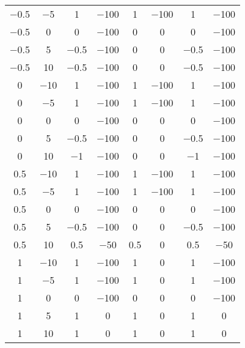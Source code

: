 {\begin{longtable}{c @{\extracolsep{\fill}} ccccccc}
            \num{-0.5} & \num{-5}  & \num{1}    & \num{-100} & \num{1}   & \num{-100} & \num{1}    & \num{-100}  \\
            \num{-0.5} & \num{0}   & \num{0}    & \num{-100} & \num{0}   & \num{0}    & \num{0}    & \num{-100}  \\
            \num{-0.5} & \num{5}   & \num{-0.5} & \num{-100} & \num{0}   & \num{0}    & \num{-0.5} & \num{-100}  \\
            \num{-0.5} & \num{10}  & \num{-0.5} & \num{-100} & \num{0}   & \num{0}    & \num{-0.5} & \num{-100}  \\
            \num{0}    & \num{-10} & \num{1}    & \num{-100} & \num{1}   & \num{-100} & \num{1}    & \num{-100}  \\
            \num{0}    & \num{-5}  & \num{1}    & \num{-100} & \num{1}   & \num{-100} & \num{1}    & \num{-100}  \\
            \num{0}    & \num{0}   & \num{0}    & \num{-100} & \num{0}   & \num{0}    & \num{0}    & \num{-100}  \\
            \num{0}    & \num{5}   & \num{-0.5} & \num{-100} & \num{0}   & \num{0}    & \num{-0.5} & \num{-100}  \\
            \num{0}    & \num{10}  & \num{-1}   & \num{-100} & \num{0}   & \num{0}    & \num{-1}   & \num{-100}  \\
            \num{0.5}  & \num{-10} & \num{1}    & \num{-100} & \num{1}   & \num{-100} & \num{1}    & \num{-100}  \\
            \num{0.5}  & \num{-5}  & \num{1}    & \num{-100} & \num{1}   & \num{-100} & \num{1}    & \num{-100}  \\
            \num{0.5}  & \num{0}   & \num{0}    & \num{-100} & \num{0}   & \num{0}    & \num{0}    & \num{-100}  \\
            \num{0.5}  & \num{5}   & \num{-0.5} & \num{-100} & \num{0}   & \num{0}    & \num{-0.5} & \num{-100}  \\
            \num{0.5}  & \num{10}  & \num{0.5}  & \num{-50}  & \num{0.5} & \num{0}    & \num{0.5}  & \num{-50}   \\
            \num{1}    & \num{-10} & \num{1}    & \num{-100} & \num{1}   & \num{0}    & \num{1}    & \num{-100}  \\
            \num{1}    & \num{-5}  & \num{1}    & \num{-100} & \num{1}   & \num{0}    & \num{1}    & \num{-100}  \\
            \num{1}    & \num{0}   & \num{0}    & \num{-100} & \num{0}   & \num{0}    & \num{0}    & \num{-100}  \\
            \num{1}    & \num{5}   & \num{1}    & \num{0}    & \num{1}   & \num{0}    & \num{1}    & \num{0}     \\
            \num{1}    & \num{10}  & \num{1}    & \num{0}    & \num{1}   & \num{0}    & \num{1}    & \num{0}     \\
        \end{longtable}}

